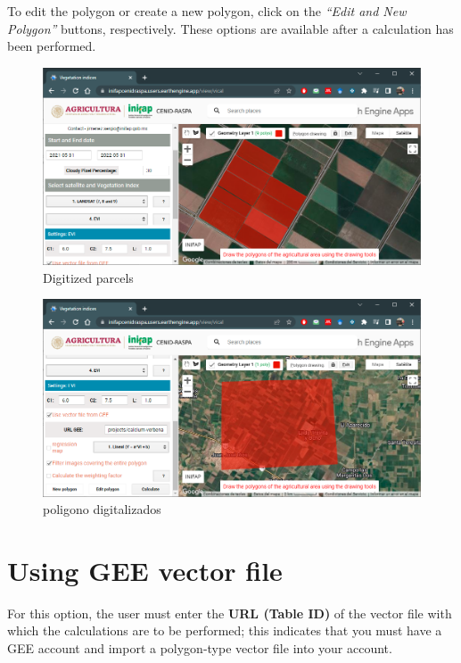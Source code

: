 \documentclass[
]{book}
\begin{document}
To edit the polygon or create a new polygon, click on the \emph{``Edit and New Polygon''} buttons, respectively. These options are available after a calculation has been performed.

\begin{figure}

{\centering \includegraphics[width=0.75\linewidth]{./images/Figure12} 

}

\caption{Digitized parcels}\label{fig:figG10}
\end{figure}

\begin{figure}

{\centering \includegraphics[width=0.75\linewidth]{./images/Figure13} 

}

\caption{poligono digitalizados}\label{fig:figG11}
\end{figure}

\hypertarget{using-gee-vector-file}{%
\section{Using GEE vector file}\label{using-gee-vector-file}}

For this option, the user must enter the \textbf{URL (Table ID)} of the vector file with which the calculations are to be performed; this indicates that you must have a GEE account and import a polygon-type vector file into your account.
\end{document}
